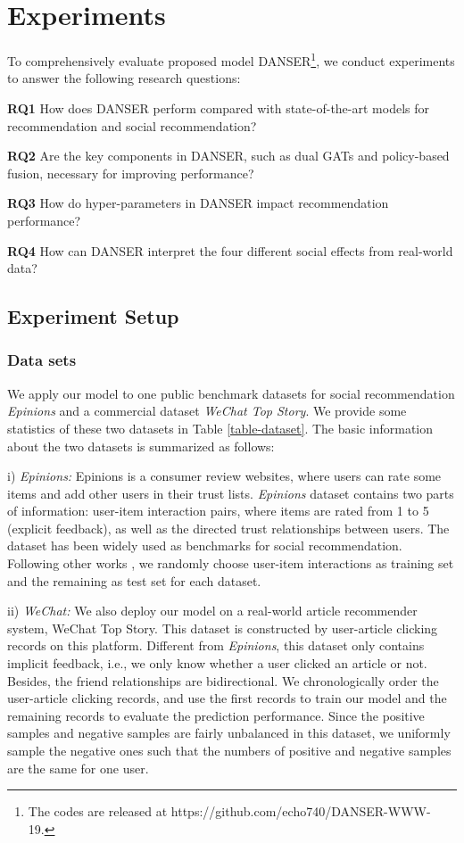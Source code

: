 \documentclass[sigconf]{acmart}
\begin{document}
\section{Experiments}

To comprehensively evaluate proposed model DANSER\footnote{The codes are released at https://github.com/echo740/DANSER-WWW-19.}, we conduct experiments to answer the following research questions:

\noindent\textbf{RQ1} How does DANSER perform compared with state-of-the-art models for recommendation and social recommendation?

\noindent\textbf{RQ2} Are the key components in DANSER, such as dual GATs and policy-based fusion, necessary for improving performance?

\noindent\textbf{RQ3} How do hyper-parameters in DANSER impact recommendation performance?

\noindent\textbf{RQ4} How can DANSER interpret {the} four different social effects from real-world data?

\subsection{Experiment Setup}
\subsubsection{Data sets} We apply our model to one public benchmark datasets for social recommendation \emph{Epinions} and a commercial dataset \emph{WeChat Top Story}. 
We provide some statistics of these two datasets in Table \ref{table-dataset}. 
The basic information about the two datasets is summarized as follows:

i) \emph{Epinions:} Epinions is a consumer review websites, where users can rate some items and add other users in their trust lists. \emph{Epinions} dataset \cite{epinion} contains two parts of information: user-item interaction pairs, where items are rated from 1 to 5 (explicit feedback), as well as the directed trust relationships between users. The dataset has been widely used as benchmarks for social recommendation. Following other works \cite{TrustSVD,TrustMF,NSCR,SREPS}, we randomly choose  user-item interactions as training set and the remaining  as test set for each dataset.

ii) \emph{WeChat:} 
We also deploy our model on a real-world article recommender system, WeChat Top Story. This dataset is constructed by user-article clicking records on this platform. Different from \emph{Epinions}, this dataset only contains implicit feedback, i.e., we only know whether a user clicked an article or not. Besides, the friend relationships are bidirectional. We chronologically order the user-article clicking records, and use the first  records to train our model and the remaining records to evaluate the prediction performance. Since the positive samples and negative samples are fairly unbalanced in this dataset, we uniformly sample the negative ones such that the numbers of positive and negative samples are the same for one user.
\end{document}
